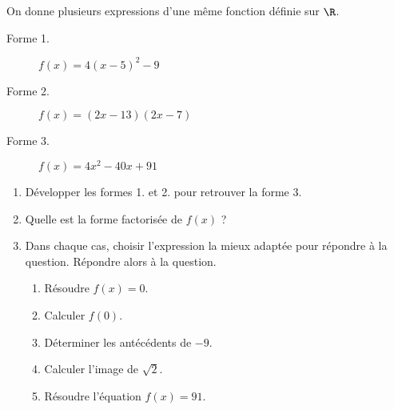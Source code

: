 
On donne plusieurs expressions d'une même fonction définie sur $\R$.
\begin{description}
\item[Forme 1.] $f(x)=4(x-5)^2-9$
\item[Forme 2.] $f(x)=(2x-13)(2x-7)$
\item[Forme 3.] $f(x)=4x^2-40x+91$
\end{description}
\begin{enumerate}
\item Développer les formes 1. et 2. pour retrouver la forme 3.
\item Quelle est la forme factorisée de $f(x)$ ?
\item Dans chaque cas, choisir l'expression la mieux adaptée pour répondre à la question. Répondre alors à la question.
\begin{enumerate}
\item Résoudre $f(x)=0$.
\item Calculer $f(0)$.
\item Déterminer les antécédents de $-9$.
\item Calculer l'image de $\sqrt{2}$.
\item Résoudre l'équation $f(x)=91$.
\end{enumerate}
\end{enumerate}